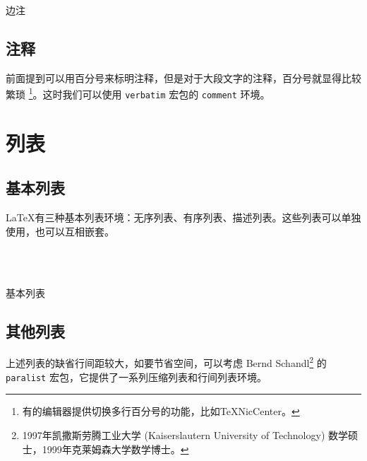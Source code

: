 \begin{example}[h]
\reversemarginpar
{}
\normalmarginpar

\begin{Code}[]
\reversemarginpar
{}
\normalmarginpar
\end{Code}
\caption{边注}
\end{example}

\subsection{注释}
前面提到可以用百分号来标明注释，但是对于大段文字的注释，百分号就显得比较繁琐 \footnote{有的编辑器提供切换多行百分号的功能，比如TeXNicCenter。}。这时我们可以使用 \texttt{verbatim} 宏包的 \texttt{comment} 环境。

\begin{Code}[]
\begin{comment}
...
\end{comment}
\end{Code}

\section{列表}\label{sec:list}

\subsection{基本列表}

\LaTeX 有三种基本列表环境：无序列表、有序列表、描述列表。这些列表可以单独使用，也可以互相嵌套。

\begin{example}[h]
\\
\\
\caption{基本列表}
\end{example}

\subsection{其他列表}

上述列表的缺省行间距较大，如要节省空间，可以考虑 Bernd Schandl\indexSchandl{}\footnote{1997年凯撒斯劳腾工业大学 (Kaiserslautern University of Technology) 数学硕士，1999年克莱姆森大学数学博士。} 的 \texttt{paralist} 宏包，它提供了一系列压缩列表和行间列表环境。

